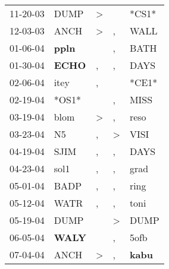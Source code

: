 \begin{supertabular}{p{0.07\textwidth}p{0.06\textwidth}p{0.02\textwidth}p{0.02\textwidth}p{0.06\textwidth}}
          11-20-03\textsuperscript{} &           DUMP\textsuperscript{} &     \textgreater &               &                            *CS1* \\
          12-03-03\textsuperscript{} &           ANCH\textsuperscript{} &     \textgreater &             , &           WALL\textsuperscript{} \\
          01-06-04\textsuperscript{} &  \textbf{ppln\textsuperscript{}} &                  &             , &           BATH\textsuperscript{} \\
          01-30-04\textsuperscript{} &  \textbf{ECHO\textsuperscript{}} &                , &             , &           DAYS\textsuperscript{} \\
          02-06-04\textsuperscript{} &           itey\textsuperscript{} &                , &               &                            *CE1* \\
          02-19-04\textsuperscript{} &                            *OS1* &                  &             , &           MISS\textsuperscript{} \\
          03-19-04\textsuperscript{} &           blom\textsuperscript{} &     \textgreater &             , &           reso\textsuperscript{} \\
          03-23-04\textsuperscript{} &             N5\textsuperscript{} &                , &  \textgreater &           VISI\textsuperscript{} \\
          04-19-04\textsuperscript{} &           SJIM\textsuperscript{} &                , &             , &           DAYS\textsuperscript{} \\
          04-23-04\textsuperscript{} &           sol1\textsuperscript{} &                , &             , &           grad\textsuperscript{} \\
          05-01-04\textsuperscript{} &           BADP\textsuperscript{} &                , &             , &           ring\textsuperscript{} \\
          05-12-04\textsuperscript{} &           WATR\textsuperscript{} &                , &             , &           toni\textsuperscript{} \\
          05-19-04\textsuperscript{} &           DUMP\textsuperscript{} &                  &  \textgreater &           DUMP\textsuperscript{} \\
          06-05-04\textsuperscript{} &  \textbf{WALY\textsuperscript{}} &                  &             , &           5ofb\textsuperscript{} \\
          07-04-04\textsuperscript{} &           ANCH\textsuperscript{} &     \textgreater &             , &  \textbf{kabu\textsuperscript{}} \\

\end{supertabular}

